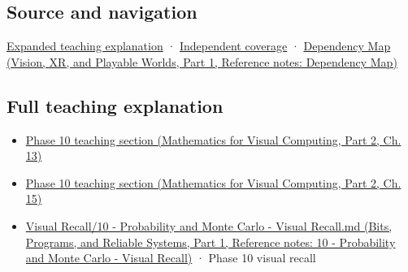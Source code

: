 \subsection{Source and navigation}\label{appendix-4192b2bdd21e-source-and-navigation}

\hypertarget{appendix-4192b2bdd21e-source-and-navigation}{}

\hyperref[04-visual-computing-ii-ch042-multiresolution-work-must-preserve-the-right-information]{Expanded teaching explanation} · \hyperref[appendix-fd090d982a15-xr01---independent-seeing-and-representation-source]{Independent coverage} · \href{../07-Vision-XR-and-Playable-Worlds-P01/main.pdf\#nameddest=appendix-4ad47bdd269a}{Dependency Map (Vision, XR, and Playable Worlds, Part 1, Reference notes: Dependency Map)}

\subsection{Full teaching explanation}\label{appendix-4192b2bdd21e-full-teaching-explanation}

\hypertarget{appendix-4192b2bdd21e-full-teaching-explanation}{}

\begin{itemize}
\tightlist
\item
  \href{../02-Mathematics-for-Visual-Computing-P02/main.pdf\#nameddest=02-foundations-ii-ch029-a-computer-produces-deterministic-pseudorandom-sequences}{Phase 10 teaching section (Mathematics for Visual Computing, Part 2, Ch. 13)}
\item
  \href{../02-Mathematics-for-Visual-Computing-P02/main.pdf\#nameddest=02-foundations-ii-ch031-use-probability-to-evaluate-graphics-and-research-claims}{Phase 10 teaching section (Mathematics for Visual Computing, Part 2, Ch. 15)}
\item
  \href{../01-Bits-Programs-and-Reliable-Systems-P01/main.pdf\#nameddest=appendix-cb5af353ef77}{Visual Recall/10 - Probability and Monte Carlo - Visual Recall.md (Bits, Programs, and Reliable Systems, Part 1, Reference notes: 10 - Probability and Monte Carlo - Visual Recall)} · Phase 10 visual recall
\end{itemize}
